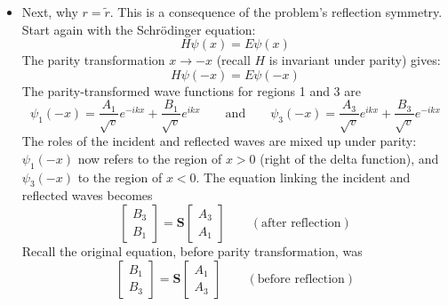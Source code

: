 \documentclass[11pt, a4paper]{article}
\newcommand{\eqtext}[1]{\qquad \text{#1} \qquad}
\newcommand{\Schro}{Schr\"{o}dinger\xspace}
\newcommand{\mat}[1]{\mathbf{#1}} %
\begin{document}
\begin{itemize}
	\item Next, why $ r = \tilde{r} $. This is a consequence of the problem's reflection symmetry. Start again with the \Schro equation:
	\begin{equation*}
		H \psi(x) = E \psi(x)
	\end{equation*}
	The parity transformation $ x \to -x $ (recall $ H $ is invariant under parity) gives:
	\begin{equation*}
		H\psi(-x) = E\psi(-x)
	\end{equation*}
	The parity-transformed wave functions for regions 1 and 3 are
	\begin{equation*}
		\psi_{1}(-x) = \frac{A_{1}}{\sqrt{v}} e^{-ikx} + \frac{B_{1}}{\sqrt{v}}e^{ikx} \eqtext{and} \psi_{3}(-x) = \frac{A_{3}}{\sqrt{v}} e^{ikx} + \frac{B_{3}}{\sqrt{v}}e^{-ikx}
	\end{equation*}
	The roles of the incident and reflected waves are mixed up under parity: $ \psi_{1}(-x) $ now refers to the region of $ x > 0 $ (right of the delta function), and $ \psi_{3}(-x) $ to the region of $ x < 0 $. The equation linking the incident and reflected waves becomes
	\begin{equation*}
		\begin{bmatrix}
			B_{3}\\
			B_{1} 
		\end{bmatrix}
		= 
		\mat{S}
		\begin{bmatrix}
			A_{3}\\
			A_{1}
		\end{bmatrix}
		\qquad (\text{after reflection})
	\end{equation*}
	Recall the original equation, before parity transformation, was
	\begin{equation*}
		\begin{bmatrix}
			B_{1}\\
			B_{3} 
		\end{bmatrix}
		= 
		\mat{S}
		\begin{bmatrix}
			A_{1}\\
			A_{3}
		\end{bmatrix}
		\qquad (\text{before reflection})
	\end{equation*}
	

\end{itemize}
\end{document}
